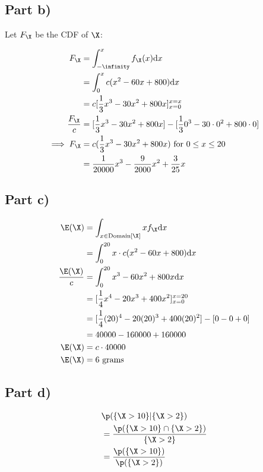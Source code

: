 \subsection*{Part b)}

Let $F_{\X}$ be the CDF of $\X$:

\begin{align*}
F_{\X} &= \int _{-\infinity} ^{x} f_{\X}(x) \mathrm{d}x \\
&= \int _0 ^{x} c(x^2 - 60x + 800) \mathrm{d}x \\
&= c [\frac{1}{3}x^3 - 30x^2 + 800x]_{x =0}^{x = x} \\
\frac{F_{\X}}{c} &= [\frac{1}{3} x^3 - 30x^2 + 800x] - [\frac{1}{3} 0^3 - 30\cdot0^2 + 800\cdot0] \\
\implies F_{\X} &= c(\frac{1}{3} x^3 - 30x^2 + 800x) \text{ for } 0 \leq x \leq 20 \\
&= \frac{1}{20000}x^3 - \frac{9}{2000}x^2 + \frac{3}{25}x
\end{align*}

\subsection*{Part c)}

\begin{align*}
\E(\X) &= \int _{x \in \mathrm{Domain}[\X]} xf_{\X}\mathrm{d}x \\
&= \int _0 ^{20} x \cdot c(x^2 - 60x + 800)\mathrm{d}x \\
\frac{\E(\X)}{c} &= \int _0 ^{20} x^3 - 60x^2 + 800x \mathrm{d}x \\
 &= [\frac{1}{4} x^4 - 20x^3 + 400x^2]^{x=20}_{x=0} \\
 &= [\frac{1}{4}(20)^4 - 20(20)^3 + 400 (20)^2] - [0 - 0 + 0] \\
 &= 40000 - 160000 + 160000 \\
\E(\X) &= c \cdot 40000 \\
\E(\X) &= 6 \text{ grams}
\end{align*}

\subsection*{Part d)}

\begin{align*}
& \p (\{ \X > 10 \} | \{ \X > 2 \}) \\
&= \frac{\p(\{ \X > 10 \} \cap  \{ \X > 2 \})}{\{ \X > 2 \}} \\
&= \frac{\p(\{ \X > 10 \})}{\p (\{ \X > 2 \})}
\end{align*}

